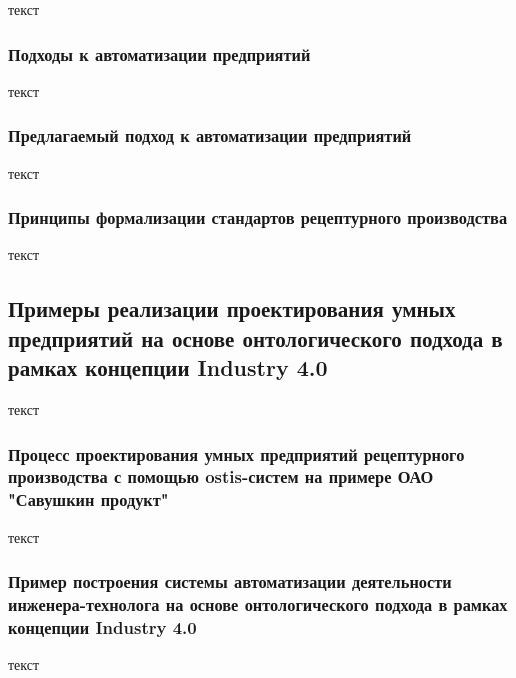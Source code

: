 текст

\subsubsection{Подходы к автоматизации предприятий}

текст

\subsubsection{Предлагаемый подход к автоматизации предприятий}

текст

\subsubsection{Принципы формализации стандартов рецептурного производства}

текст

\subsection{Примеры реализации проектирования умных предприятий на основе онтологического подхода в рамках концепции Industry 4.0}

текст

\subsubsection{Процесс проектирования умных предприятий рецептурного производства с помощью ostis-систем на примере ОАО "Савушкин продукт"}

текст

\subsubsection{Пример построения системы автоматизации деятельности инженера-технолога на основе онтологического подхода в рамках концепции Industry 4.0}

текст


%